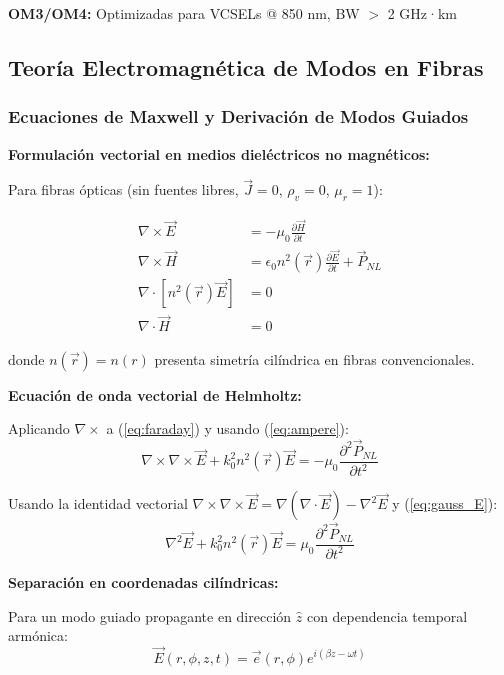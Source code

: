 \documentclass[11pt,a4paper]{article}
\begin{document}
\textbf{OM3/OM4:} Optimizadas para VCSELs @ 850 nm, BW $>$ 2 GHz·km

\subsection{Teoría Electromagnética de Modos en Fibras}

\subsubsection{Ecuaciones de Maxwell y Derivación de Modos Guiados}

\textbf{Formulación vectorial en medios dieléctricos no magnéticos:}

Para fibras ópticas (sin fuentes libres, $\vec{J} = 0$, $\rho_v = 0$, $\mu_r = 1$):

\begin{align}
    \nabla \times \vec{E} &= -\mu_0\frac{\partial \vec{H}}{\partial t} \label{eq:faraday}\\
    \nabla \times \vec{H} &= \epsilon_0 n^2(\vec{r})\frac{\partial \vec{E}}{\partial t} + \vec{P}_{NL} \label{eq:ampere}\\
    \nabla \cdot [n^2(\vec{r})\vec{E}] &= 0 \label{eq:gauss_E}\\
    \nabla \cdot \vec{H} &= 0 \label{eq:gauss_H}
\end{align}

donde $n(\vec{r}) = n(r)$ presenta simetría cilíndrica en fibras convencionales.

\textbf{Ecuación de onda vectorial de Helmholtz:}

Aplicando $\nabla \times$ a (\ref{eq:faraday}) y usando (\ref{eq:ampere}):
\begin{equation}
    \nabla \times \nabla \times \vec{E} + k_0^2 n^2(\vec{r})\vec{E} = -\mu_0 \frac{\partial^2 \vec{P}_{NL}}{\partial t^2}
\end{equation}

Usando la identidad vectorial $\nabla \times \nabla \times \vec{E} = \nabla(\nabla \cdot \vec{E}) - \nabla^2\vec{E}$ y (\ref{eq:gauss_E}):
\begin{equation}
    \nabla^2\vec{E} + k_0^2 n^2(\vec{r})\vec{E} = \mu_0 \frac{\partial^2 \vec{P}_{NL}}{\partial t^2}
\end{equation}

\textbf{Separación en coordenadas cilíndricas:}

Para un modo guiado propagante en dirección $\hat{z}$ con dependencia temporal armónica:
\begin{equation}
    \vec{E}(r,\phi,z,t) = \vec{e}(r,\phi)e^{i(\beta z - \omega t)}
\end{equation}
\end{document}
